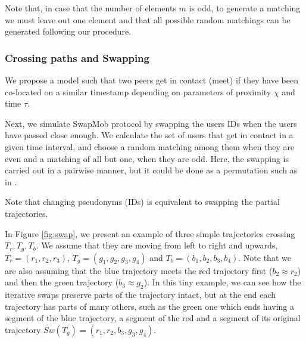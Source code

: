 \documentclass[]{llncs}
\begin{document}
Note that, in case that the number of elements $m$ is odd, to generate a matching we must leave out one element and that all possible random matchings can be generated following our procedure.

\subsubsection{Crossing paths and Swapping} \label{sec:cross}
We propose a model such that two peers get in contact (meet) if they have been co-located on a similar timestamp depending on parameters of proximity $\chi$ and time $\tau$.


Next, we simulate SwapMob protocol by swapping the users IDs when the users have passed close enough.
We calculate the set of users that get in contact in a given time interval, and choose a random matching among them when they are even and a matching of all but one, when they are odd.
Here, the swapping is carried out in a pairwise manner, but it could be done as a permutation such as in \cite{Beresford04mixzones}.

Note that changing pseudonyms (IDs) is equivalent to swapping the partial trajectories.


   	

In Figure \ref{fig:swap}, we present an example of three simple trajectories crossing $T_r, T_g, T_b$. We assume that they are moving from left to right and upwards, $T_r = (r_1, r_2, r_3)$, $T_g = (g_1, g_2, g_3, g_4)$ and $T_b = (b_1, b_2, b_3, b_4)$. Note that we are also assuming that the blue trajectory meets the red trajectory first ($b_2 \approx r_2$) and then the green trajectory ($b_3 \approx g_2$). In this tiny example, we can see how the iterative swaps preserve parts of the trajectory intact, but at the end each trajectory has parts of many others, such as the green one which ends having a segment of the blue trajectory, a segment of the red and a segment of its original trajectory $Sw(T_g)=(r_1, r_2, b_3, g_3, g_4)$.
\end{document}
